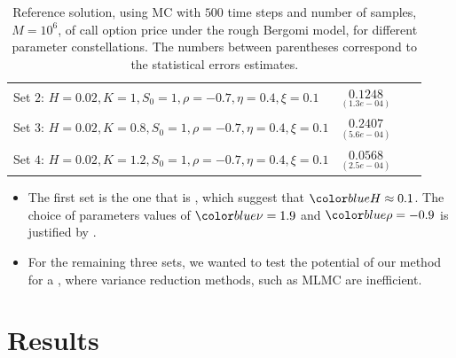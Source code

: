\documentclass[ima, 20pt, portrait, plainboxedsections]{sciposter}
\begin{document}
\begin{multicols}{3}
\begin{table}[!h]
\begin{tiny}
\begin{tabular}{l*{2}{c}r}
				Set $2$:	$H=0.02, K=1, S_0=1, \rho=-0.7, \eta=0.4,\xi=0.1$   & $\underset{(1.3e-04)}{0.1248}$  \\
					Set $3$:	$H=0.02, K=0.8,S_0=1, \rho=-0.7, \eta=0.4,\xi=0.1$   & $\underset{(5.6e-04)}{0.2407}$  \\
						Set $4$:	$H=0.02, K=1.2,S_0=1, \rho=-0.7, \eta=0.4,\xi=0.1$   & $\underset{(2.5e-04)}{0.0568}$  \\
	\end{tabular}
	\vspace{0.1cm}
	\caption{Reference solution, using MC with $500$ time steps and number of samples, $M=10^6$, of call option price under the rough Bergomi model, for different parameter constellations.  The numbers between parentheses correspond to the statistical errors estimates.}
	\label{table:Reference solution, using MC with $500$ time steps, of Call option price under rBergomi model, for different parameter constellation.}
	\end{tiny}
\end{table}

\begin{itemize}
\item The first set is the one that is  \cite{gatheral2014volatility,bennedsen2016decoupling}, which suggest that $\blue{H} \approx 0.1$. The choice of parameters values of $\blue{\nu}= 1.9$ and $\blue{\rho}=-0.9$ is justified by \cite{bayer2016pricing}.

\item  For the remaining three sets, we wanted to test the potential of our method for a , where variance reduction methods, such as MLMC are inefficient.
\end{itemize}
\section*{Results}


\end{multicols}
\end{document}
